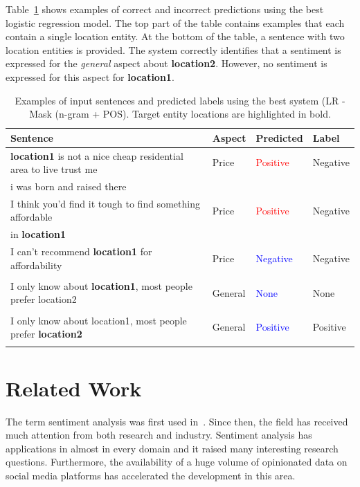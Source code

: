 \documentclass[11pt]{article}
\begin{document}
    Table~\ref{tab:examples} shows examples of correct and incorrect predictions using the best logistic regression model. The top part of the table contains examples that each contain a single location entity. At the bottom of the table, a sentence with two location entities is provided. The system correctly identifies that a  sentiment is expressed for the \textit{general} aspect about \textbf{location2}. However, no sentiment is expressed for this aspect for \textbf{location1}.
    \begin{table}[h]
        \centering
        \begin{tabular}{| l | l | l | l |}
        \hline
             \textbf{Sentence}                                                              &    \textbf{Aspect} & \textbf{Predicted} & \textbf{Label}    \\
            \hline
            \textbf{location1} is not a nice cheap residential area to live trust me  	& Price & \textcolor{red}{Positive} & Negative \\
            i was born and raised there & & &\\
            \hline
            I think you'd find it tough to find something affordable 	&Price & \textcolor{red}{Positive} & Negative \\
             in \textbf{location1} & & & \\
             \hline
             I can't recommend \textbf{location1} for affordability & Price	 & \textcolor{blue}{Negative} & Negative \\
              & & & \\
             \hline
             \hline
             I only know about \textbf{location1}, most people prefer location2 & General & \textcolor{blue}{None} & None \\
              & & & \\
            \hline
             I only know about location1, most people prefer \textbf{location2} & General & \textcolor{blue}{Positive} & Positive \\
              & & & \\
            \hline
      \end{tabular}
        \caption{Examples of input sentences and predicted labels using the best system (LR - Mask (n-gram + POS). Target entity locations are highlighted in bold.}
        \label{tab:examples}
    \end{table} 
\section{Related Work}
    The term sentiment analysis was first used in~\cite{analyzer2003extracting}. Since then, the field has received much attention from both research and industry. Sentiment analysis has applications in almost in every domain and it raised many interesting research questions. Furthermore, the availability of a huge volume of opinionated data on social media platforms has accelerated the development in this area.
    
\end{document}

